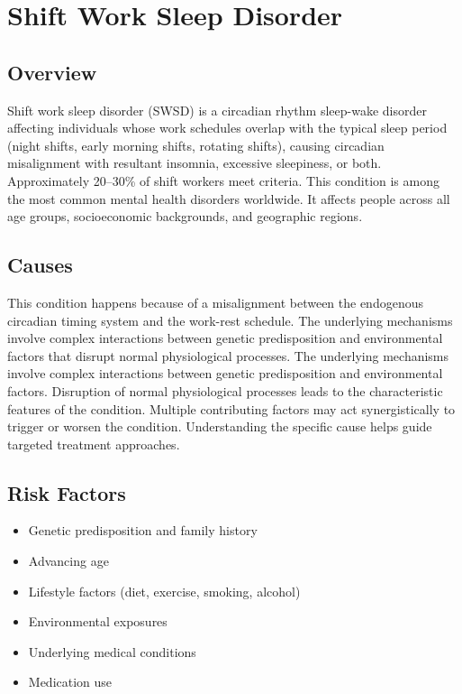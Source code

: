 \chapter{Shift Work Sleep Disorder}
\label{sec:Shift Work Sleep Disorder}

\section{Overview}
Shift work sleep disorder (SWSD) is a circadian rhythm sleep-wake disorder affecting individuals whose work schedules overlap with the typical sleep period (night shifts, early morning shifts, rotating shifts), causing circadian misalignment with resultant insomnia, excessive sleepiness, or both. Approximately 20--30\% of shift workers meet criteria. This condition is among the most common mental health disorders worldwide. It affects people across all age groups, socioeconomic backgrounds, and geographic regions.
\section{Causes}
This condition happens because of a misalignment between the endogenous circadian timing system and the work-rest schedule. The underlying mechanisms involve complex interactions between genetic predisposition and environmental factors that disrupt normal physiological processes. The underlying mechanisms involve complex interactions between genetic predisposition and environmental factors. Disruption of normal physiological processes leads to the characteristic features of the condition. Multiple contributing factors may act synergistically to trigger or worsen the condition. Understanding the specific cause helps guide targeted treatment approaches.
\section{Risk Factors}


\begin{itemize}[noitemsep]
  \item Genetic predisposition and family history
  \item Advancing age
  \item Lifestyle factors (diet, exercise, smoking, alcohol)
  \item Environmental exposures
  \item Underlying medical conditions
  \item Medication use
\end{itemize}

